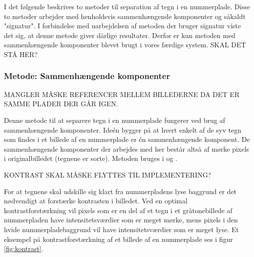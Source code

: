 



I det følgende beskrives to metoder til separation af tegn i en nummerplade. Disse to metoder arbejder med henholdsvis sammenhængende komponenter og såkaldt "signatur". I forbindelse med uarbejdelsen af metoden der bruger signatur viste det sig, at denne metode giver dårlige resultater. Derfor er kun metoden med sammenhængende komponenter blevet brugt i vores færdige system. SKAL DET STÅ HER?


\subsubsection*{Metode: Sammenhængende komponenter}

MANGLER MÅSKE REFERENCER MELLEM BILLEDERNE DA DET ER SAMME PLADER DER GÅR IGEN.

Denne metode til at separere tegn i en nummerplade fungerer ved brug af sammenhængende komponenter. Ideén bygger på at hvert enkelt af de syv tegn som findes i et billede af en nummerplade er én sammenhængende komponent. De sammenhængende komponenter der arbejdes med her består altså af mørke pixels i originalbilledet (tegnene er sorte). Metoden bruges i \cite{nijhuis} og \cite{kwas}.

KONTRAST SKAL MÅSKE FLYTTES TIL IMPLEMENTERING?

For at tegnene skal udskille sig klart fra nummerpladens lyse baggrund er det nødvendigt at forstærke kontrasten i billedet. Ved en optimal kontrastforstærkning vil pixels som er en del af et tegn i et gråtonebillede af nummerpladen have intensitetsværdier som er meget mørke, mens pixels i den hvide nummerpladebaggrund vil have intensitetsværdier som er meget lyse. Et eksempel på kontrastforstærkning af et billede af en nummerplade ses i figur \vref{fig:kontrast}.

